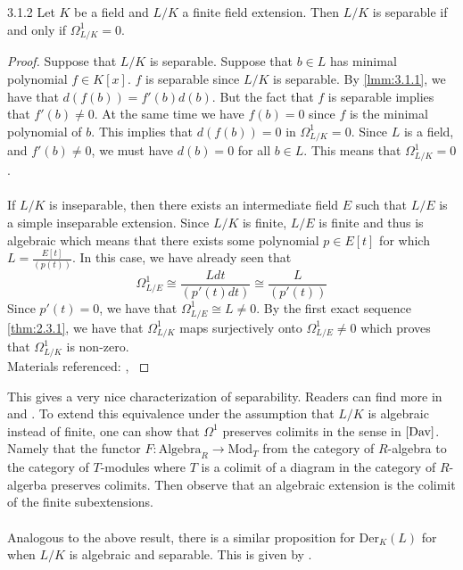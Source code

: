 \documentclass[a4paper]{article}
\begin{document}
\begin{prp}{}{3.1.2} Let $K$ be a field and $L/K$ a finite field extension. Then $L/K$ is separable if and only if $\Omega_{L/K}^1=0$. \tcbline
\begin{proof}
Suppose that $L/K$ is separable. Suppose that $b\in L$ has minimal polynomial $f\in K[x]$. $f$ is separable since $L/K$ is separable. By \ref{lmm:3.1.1}, we have that $d(f(b))=f'(b)d(b)$. But the fact that $f$ is separable implies that $f'(b)\neq 0$. At the same time we have $f(b)=0$ since $f$ is the minimal polynomial of $b$. This implies that $d(f(b))=0$ in $\Omega_{L/K}^1=0$. Since $L$ is a field, and $f'(b)\neq 0$, we must have $d(b)=0$ for all $b\in L$. This means that $\Omega_{L/K}^1=0$. \\~\\

If $L/K$ is inseparable, then there exists an intermediate field $E$ such that $L/E$ is a simple inseparable extension. Since $L/K$ is finite, $L/E$ is finite and thus is algebraic which means that there exists some polynomial $p\in E[t]$ for which $L=\frac{E[t]}{(p(t))}$. In this case, we have already seen that $$\Omega_{L/E}^1\cong\frac{Ldt}{(p'(t)dt)}\cong\frac{L}{(p'(t))}$$ Since $p'(t)=0$, we have that $\Omega_{L/E}^1\cong L\neq 0$. By the first exact sequence \ref{thm:2.3.1}, we have that $\Omega_{L/K}^1$ maps surjectively onto $\Omega_{L/E}^1\neq 0$ which proves that $\Omega_{L/K}^1$ is non-zero. \\
Materials referenced: \cite{Per}, \cite{Liu}
\end{proof}
\end{prp}

This gives a very nice characterization of separability. Readers can find more in \cite{Har} and \cite{Liu}. To extend this equivalence under the assumption that $L/K$ is algebraic instead of finite, one can show that $\Omega^1$ preserves colimits in the sense in $\cite{Dav}$. Namely that the functor $F:\text{Algebra}_R\to\text{Mod}_T$ from the category of $R$-algebra to the category of $T$-modules where $T$ is a colimit of a diagram in the category of $R$-algerba preserves colimits. Then observe that an algebraic extension is the colimit of the finite subextensions. \\~\\

Analogous to the above result, there is a similar proposition for $\text{Der}_K(L)$ for when $L/K$ is algebraic and separable. This is given by \cite{Pat}. 
\end{document}
